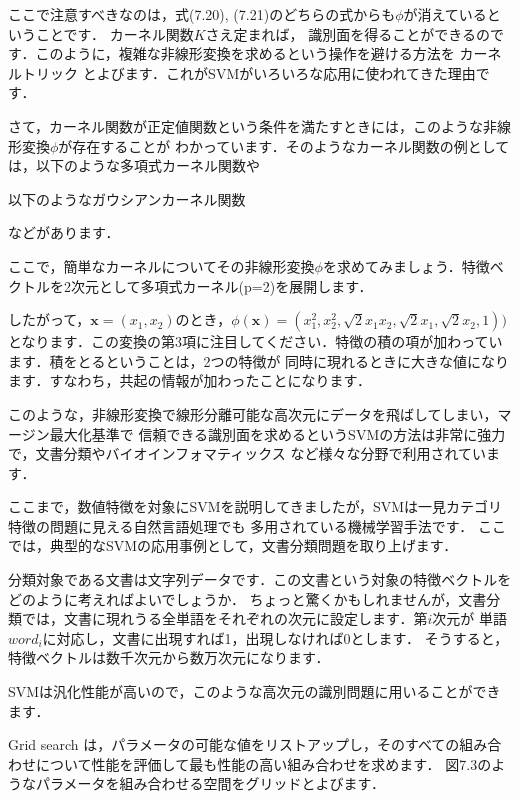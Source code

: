 ここで注意すべきなのは，式(7.20), (7.21)のどちらの式からも$\phi$が消えているということです．
カーネル関数$K$さえ定まれば，
識別面を得ることができるのです．このように，複雑な非線形変換を求めるという操作を避ける方法を
カーネルトリック
とよびます．これがSVMがいろいろな応用に使われてきた理由です．


さて，カーネル関数が正定値関数という条件を満たすときには，このような非線形変換$\phi$が存在することが
わかっています．そのようなカーネル関数の例としては，以下のような多項式カーネル関数や

以下のようなガウシアンカーネル関数

などがあります．


ここで，簡単なカーネルについてその非線形変換$\phi$を求めてみましょう．特徴ベクトルを2次元として多項式カーネル(p=2)を展開します．

したがって，$\bm{x}=(x_1, x_2)$のとき，$\phi(\bm{x})=(x_1^2, x_2^2, \sqrt{2} x_1 x_2, \sqrt{2} x_1, \sqrt{2} x_2, 1) )$
となります．この変換の第3項に注目してください．特徴の積の項が加わっています．積をとるということは，2つの特徴が
同時に現れるときに大きな値になります．すなわち，共起の情報が加わったことになります．

このような，非線形変換で線形分離可能な高次元にデータを飛ばしてしまい，マージン最大化基準で
信頼できる識別面を求めるというSVMの方法は非常に強力で，文書分類やバイオインフォマティックス
など様々な分野で利用されています．


ここまで，数値特徴を対象にSVMを説明してきましたが，SVMは一見カテゴリ特徴の問題に見える自然言語処理でも
多用されている機械学習手法です．
ここでは，典型的なSVMの応用事例として，文書分類問題を取り上げます．

分類対象である文書は文字列データです．この文書という対象の特徴ベクトルをどのように考えればよいでしょうか．
ちょっと驚くかもしれませんが，文書分類では，文書に現れうる全単語をそれぞれの次元に設定します．第$i$次元が
単語$word_i$に対応し，文書に出現すれば1，出現しなければ0とします．
そうすると，特徴ベクトルは数千次元から数万次元になります．

SVMは汎化性能が高いので，このような高次元の識別問題に用いることができます．


Grid search は，パラメータの可能な値をリストアップし，そのすべての組み合わせについて性能を評価して最も性能の高い組み合わせを求めます．
図7.3のようなパラメータを組み合わせる空間をグリッドとよびます．

